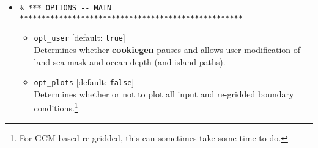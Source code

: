 \begin{itemize}
\begin{itemize}[noitemsep]

\vspace{1mm}
\item [] \texttt{par\_max\_D} [default: \texttt{5000.0}]
\vspace{1mm}
\\Sets the maximum ocean (scale) depth (in m).
\\ See subsequent sub-sub-section on 'Ocean depth (and maximum levels)' for further details and usage.

\vspace{1mm}
For the sediment model re-gridding (you can ignore this is you are not using the \textbf{SEDGEM} module and wanting to simulate marine sediments, and have \texttt{par\_sedsopt=2} selected), there is:
\vspace{1mm}
\item [] \texttt{par\_sed\_Dmin} [default: \texttt{1000.0}]
\\\texttt{par\_sed\_Dmax} [default: \texttt{5000.0}]
\vspace{1mm}
\\which together set the minimum and maximum depths used in generating a random seafloor topography for \textbf{SEDGEM}.\footnote{Note that while \(5000m\) corresponds to the default deepest depth of the ocean circulation model, about \(15\%\) of the modern seafloor lies below this (and mostly shallower than \(6000m\)). So selecting \texttt{6000.0} would arguably enable a better simulation of e.g. the CCD.}

\end{itemize}

\vspace{2mm}
\item []
\small\vspace{-2pt}\begin{verbatim}
% *** OPTIONS -- MAIN ***************************************************
\end{verbatim}\vspace{-2pt}\normalsize

\begin{itemize}[noitemsep]

\vspace{1mm}
\item [] \texttt{opt\_user} [default: \texttt{true}]
\vspace{1mm}
\\Determines whether \textbf{cookiegen} pauses and allows user-modification of land-sea mask and ocean depth (and island paths).

\vspace{1mm}
\item [] \texttt{opt\_plots} [default: \texttt{false}]
\vspace{1mm}
\\Determines whether or not to plot all input and re-gridded boundary conditions.\footnote{For GCM-based re-gridded, this can sometimes take some time to do.}

\end{itemize}

\end{itemize}

